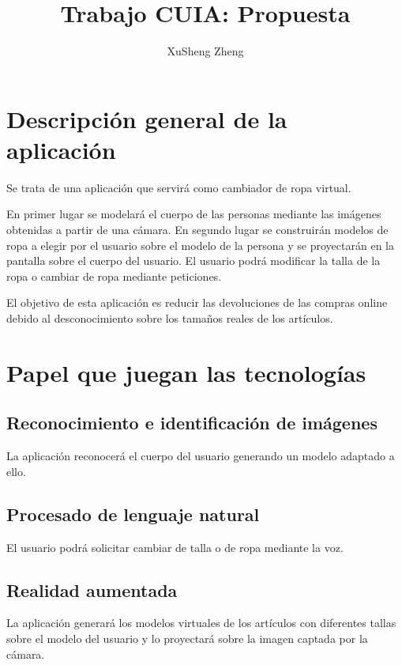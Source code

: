 \documentclass[twoside]{article}
\title{Trabajo CUIA: Propuesta}
\author{XuSheng Zheng}
\date{}
\begin{document}
\maketitle
\section{Descripción general de la aplicación}
Se trata de una aplicación que servirá como cambiador de ropa virtual.

En primer lugar se modelará el cuerpo de las personas mediante las imágenes obtenidas a partir de una cámara. En segundo lugar se construirán modelos de ropa a elegir por el usuario sobre el modelo de la persona y se proyectarán en la pantalla sobre el cuerpo del usuario. El usuario podrá modificar la talla de la ropa o cambiar de ropa mediante peticiones. 

El objetivo de esta aplicación es reducir las devoluciones de las compras online debido al desconocimiento sobre los tamaños reales de los artículos.

\section{Papel que juegan las tecnologías}
\subsection{Reconocimiento e identificación de imágenes}
La aplicación reconocerá el cuerpo del usuario generando un modelo adaptado a ello.
\subsection{Procesado de lenguaje natural}
El usuario podrá solicitar cambiar de talla o de ropa mediante la voz.
\subsection{Realidad aumentada}
La aplicación generará los modelos virtuales de los artículos con diferentes tallas sobre el modelo del usuario y lo proyectará sobre la imagen captada por la cámara.
\end{document}
